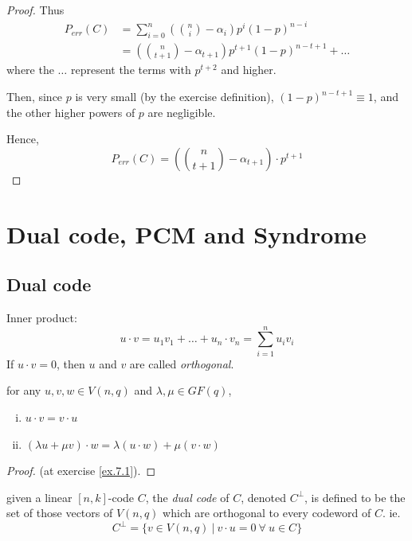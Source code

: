 \documentclass{article}
\theoremstyle{definition}
\newenvironment{defn}[1]
{\renewcommand\theinnerdefn{#1}\innerdefn}
{\endinnerdefn}
\newenvironment{lemma}[1]
{\renewcommand\theinnerlemma{#1}\innerlemma}
{\endinnerlemma}
\newcommand{\Vnq}{V(n, q)}
\begin{document}
\begin{proof}
  Thus
  \begin{align*}
    P_{err}(C) &= \sum_{i=0}^n \left( \binom{n}{i} - \alpha_i \right) p^i (1-p)^{n-i}\\
               &= \left( \binom{n}{t+1} - \alpha_{t+1} \right) p^{t+1} (1-p)^{n-t+1} + \ldots
  \end{align*}
  where the $\ldots$ represent the terms with $p^{t+2}$ and higher.

  Then, since $p$ is very small (by the exercise definition), $(1-p)^{n-t+1} \equiv 1$, and the other higher powers of $p$ are negligible.

  Hence,
  $$P_{err}(C) = \left( \binom{n}{t+1} - \alpha_{t+1} \right) \cdot p^{t+1}$$
\end{proof}


\vspace{1.0cm}

\section{Dual code, PCM and Syndrome}

\subsection{Dual code}

\begin{defn}{}[Orthogonal]
  Inner product:
  $$u \cdot v = u_1 v_1 + \ldots + u_n \cdot v_n = \sum_{i=1}^n u_i v_i$$
  If $u \cdot v = 0$, then $u$ and $v$ are called \emph{orthogonal}.
\end{defn}

\begin{lemma}{7.1} \label{7.1}
  for any $u,v,w \in \Vnq$ and $\lambda, \mu \in GF(q)$,
  \begin{enumerate}[i.]
    \item $u \cdot v = v \cdot u$
    \item $(\lambda u + \mu v) \cdot w = \lambda(u \cdot w) + \mu (v \cdot w)$
  \end{enumerate}
\end{lemma}
\begin{proof}
  (at exercise \ref{ex.7.1}).
\end{proof}

\begin{defn}{}[Dual code]
  given a linear $[n, k]$-code $C$, the \emph{dual code} of $C$, denoted $C^{\perp}$, is defined to be the set of those vectors of $\Vnq$ which are orthogonal to every codeword of $C$. ie.
  $$C^{\perp} = \{ v \in \Vnq ~|~ v \cdot u = 0 ~\forall~ u \in C \}$$
\end{defn}
\end{document}
